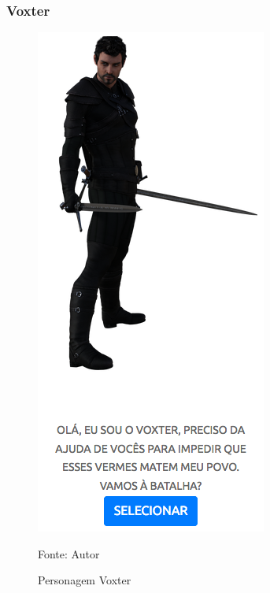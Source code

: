 \subsubsection{Voxter}
\begin{figure}[h]
	\centering
	\includegraphics[keepaspectratio=true,scale=0.6]{figuras/voxter.png}
	\caption{Personagem Voxter}
	Fonte: Autor
	\label{voxter}
\end{figure}
\clearpage
